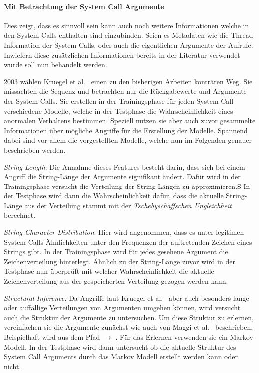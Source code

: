     \paragraph{Mit Betrachtung der System Call Argumente}\label{sec:related_sys_arg}

        Dies zeigt, dass es sinnvoll sein kann auch noch weitere Informationen welche in den System Calls enthalten sind einzubinden.
        Seien es Metadaten wie die Thread Information der System Calls, oder auch die eigentlichen Argumente der Aufrufe.
        Inwiefern diese zusätzlichen Informationen bereits in der Literatur verwendet wurde soll nun behandelt werden.

        2003 wählen Kruegel et al.~\cite{ARGUMENTS} einen zu den bisherigen Arbeiten konträren Weg.
        Sie missachten die Sequenz und betrachten nur die Rückgabewerte und Argumente der System Calls.
        Sie erstellen in der Trainingsphase für jeden System Call verschiedene Modelle, welche in der Testphase die Wahrscheinlichkeit eines anormalen Verhaltens bestimmen.
        Speziell nutzen sie aber auch zuvor gesammelte Informationen über mögliche Angriffe für die Erstellung der Modelle.
        Spannend dabei sind vor allem die vorgestellten Modelle, welche nun im Folgenden genauer beschrieben werden.

        \textit{String Length}: Die Annahme dieses Features besteht darin, dass sich bei einem Angriff die String-Länge der Argumente signifikant ändert.
        Dafür wird in der Trainingsphase versucht die Verteilung der String-Längen zu approximieren.S
        In der Testphase wird dann die Wahrscheinlichkeit dafür, dass die aktuelle String-Länge aus der Verteilung stammt mit der \textit{Tschebyschaffschen Ungleichheit} berechnet.
        
        \textit{String Character Distribution}: Hier wird angenommen, dass es unter legitimen System Calls Ähnlichkeiten unter den Frequenzen der auftretenden Zeichen eines Strings gibt.
        In der Trainingsphase wird für jedes gesehene Argument die Zeichenverteilung hinterlegt.
        Ähnlich zu der String-Länge zuvor wird in der Testphase nun überprüft mit welcher Wahrscheinlichkeit die aktuelle Zeichenverteilung aus der gespeicherten Verteilung gezogen werden kann.

        \textit{Structural Inference:} Da Angriffe laut Kruegel et al.~\cite{ARGUMENTS} aber auch besonders lange oder auffällige Verteilungen von Argumenten umgehen können, wird versucht auch die Struktur der Argumente zu untersuchen.
        Um diese Struktur zu erlernen, vereinfachen sie die Argumente zunächst wie auch von Maggi et al.~\cite{ARGUMENTS2} beschrieben.
        Beispielhaft wird aus dem Pfad  $\longrightarrow$ .
        Für das Erlernen verwenden sie ein Markov Modell.
        In der Testphase wird dann untersucht ob die aktuelle Struktur des System Call Arguments durch das Markov Modell erstellt werden kann oder nicht.

